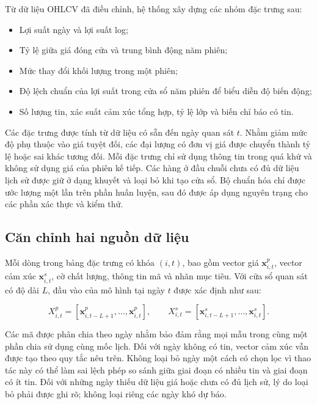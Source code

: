 \documentclass[12pt, a4paper, oneside]{report}
\begin{document}
Từ dữ liệu OHLCV đã điều chỉnh, hệ thống xây dựng các nhóm đặc trưng sau:

\begin{itemize}[nosep]
  \item Lợi suất ngày và lợi suất log;
  \item Tỷ lệ giữa giá đóng cửa và trung bình động năm phiên;
  \item Mức thay đổi khối lượng trong một phiên;
  \item Độ lệch chuẩn của lợi suất trong cửa sổ năm phiên để biểu diễn độ biến động;
  \item Số lượng tin, xác suất cảm xúc tổng hợp, tỷ lệ lớp và biến chỉ báo có tin.
\end{itemize}

Các đặc trưng được tính từ dữ liệu có sẵn đến ngày quan sát $t$. Nhằm giảm mức độ phụ thuộc vào giá tuyệt đối, các đại lượng có đơn vị giá được chuyển thành tỷ lệ hoặc sai khác tương đối. Mỗi đặc trưng chỉ sử dụng thông tin trong quá khứ và không sử dụng giá của phiên kế tiếp. Các hàng ở đầu chuỗi chưa có đủ dữ liệu lịch sử được giữ ở dạng khuyết và loại bỏ khi tạo cửa sổ. Bộ chuẩn hóa chỉ được ước lượng một lần trên phần huấn luyện, sau đó được áp dụng nguyên trạng cho các phần xác thực và kiểm thử.

\subsection{Căn chỉnh hai nguồn dữ liệu}

Mỗi dòng trong bảng đặc trưng có khóa $(i,t)$, bao gồm vector giá $\mathbf{x}^{p}_{i,t}$, vector cảm xúc $\mathbf{x}^{s}_{i,t}$, cờ chất lượng, thông tin mã và nhãn mục tiêu. Với cửa sổ quan sát có độ dài $L$, đầu vào của mô hình tại ngày $t$ được xác định như sau:

\begin{equation}
  X^{p}_{i,t}=[\mathbf{x}^{p}_{i,t-L+1},\ldots,\mathbf{x}^{p}_{i,t}],
  \qquad
  X^{s}_{i,t}=[\mathbf{x}^{s}_{i,t-L+1},\ldots,\mathbf{x}^{s}_{i,t}].
  \label{eq:input-windows}
\end{equation}

Các mã được phân chia theo ngày nhằm bảo đảm rằng mọi mẫu trong cùng một phần chia sử dụng cùng mốc lịch. Đối với ngày không có tin, vector cảm xúc vẫn được tạo theo quy tắc nêu trên. Không loại bỏ ngày một cách có chọn lọc vì thao tác này có thể làm sai lệch phép so sánh giữa giai đoạn có nhiều tin và giai đoạn có ít tin. Đối với những ngày thiếu dữ liệu giá hoặc chưa có đủ lịch sử, lý do loại bỏ phải được ghi rõ; không loại riêng các ngày khó dự báo.
\end{document}
